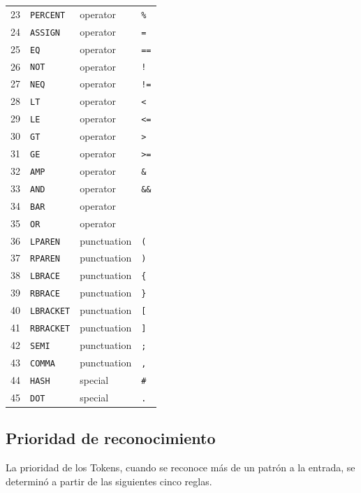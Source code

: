 \documentclass[12pt,letterpaper]{article}
\newcommand{\cd}[1]{\texttt{#1}}                       %
\begin{document}
\begin{center}
\begin{longtable}{@{}r l l p{6.6cm}@{}}
23 & \cd{PERCENT}     & operator    & \cd{\%} \\
24 & \cd{ASSIGN}      & operator    & \cd{=} \\
25 & \cd{EQ}          & operator    & \cd{==} \\
26 & \cd{NOT}         & operator    & \cd{!} \\
27 & \cd{NEQ}         & operator    & \cd{!=} \\
28 & \cd{LT}          & operator    & \cd{<} \\
29 & \cd{LE}          & operator    & \cd{<=} \\
30 & \cd{GT}          & operator    & \cd{>} \\
31 & \cd{GE}          & operator    & \cd{>=} \\
32 & \cd{AMP}         & operator    & \cd{\&} \\
33 & \cd{AND}         & operator    & \cd{\&\&} \\
34 & \cd{BAR}         & operator    & \cd{\textbar} \\
35 & \cd{OR}          & operator    & \cd{\textbar\textbar} \\
36 & \cd{LPAREN}      & punctuation & \cd{(} \\
37 & \cd{RPAREN}      & punctuation & \cd{)} \\
38 & \cd{LBRACE}      & punctuation & \cd{\{} \\
39 & \cd{RBRACE}      & punctuation & \cd{\}} \\
40 & \cd{LBRACKET}    & punctuation & \cd{[} \\
41 & \cd{RBRACKET}    & punctuation & \cd{]} \\
42 & \cd{SEMI}        & punctuation & \cd{;} \\
43 & \cd{COMMA}       & punctuation & \cd{,} \\
44 & \cd{HASH}        & special     & \cd{\#} \\
45 & \cd{DOT}         & special     & \cd{.} \\
\end{longtable}



\end{center}

\subsection{Prioridad de reconocimiento}
La prioridad de los Tokens, cuando se reconoce más de un patrón a la entrada, se determinó a partir de las siguientes cinco reglas.
\end{document}
